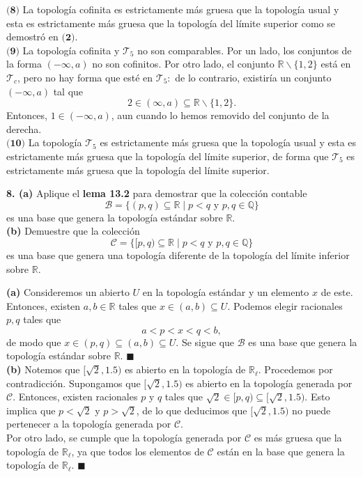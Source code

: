 \documentclass{article}
\begin{document}
$\textbf{(8)}$ La topología cofinita es estrictamente más gruesa que la topología usual y esta es estrictamente más gruesa que la topología del límite superior como se demostró en $\textbf{(2)}$.\\ 

$\textbf{(9)}$ La topología cofinita y $\mathcal{T}_{5}$ no son comparables. Por un lado, los conjuntos de la forma $(- \infty, a)$ no son cofinitos. Por otro lado, el conjunto $\mathbb{R} \backslash \{ 1, 2\}$ está en $\mathcal{T}_{c}$, pero no hay forma que esté en $\mathcal{T}_{5}: $ de lo contrario, existiría un conjunto $(-\infty, a)$ tal que
$$  2 \in (\infty, a) \subseteq \mathbb{R} \backslash \{1, 2 \}.$$ 
Entonces, $1 \in (- \infty, a)$, aun cuando lo hemos removido del conjunto de la derecha. \\

$\textbf{(10)}$ La topología $\mathcal{T}_{5}$ es estrictamente más gruesa que la topología usual y esta es estrictamente más gruesa que la topología del límite superior, de forma que $\mathcal{T}_{5}$ es estrictamente más gruesa que la topología del límite superior. \\
 

\begin{mybox}
\textbf{8. (a)} Aplique el \textbf{lema 13.2} para demostrar que la colección contable 
$$ \mathcal{B} = \{ (p, q) \subseteq \mathbb{R} \mid p < q \text{ y } p, q \in \mathbb{Q} \} $$
es una base que genera la topología estándar sobre $\mathbb{R}$.	\\

\textbf{(b) }Demuestre que la colección 
$$ \mathcal{C} = \{ [p, q) \subseteq \mathbb{R} \mid p < q \text{ y }p, q \in \mathbb{Q} \} $$
es una base que genera una topología diferente de la topología del límite inferior sobre $\mathbb{R}$.
\end{mybox}	

\textbf{(a)} Consideremos un abierto $U$ en la topología estándar y un elemento $x$ de este. Entonces, existen $a, b \in \mathbb{R}$ tales que $x \in (a, b) \subseteq U$. Podemos elegir racionales $p, q$ tales que 
$$ a < p < x < q < b ,$$
de modo que $x \in (p, q) \subseteq (a, b ) \subseteq U.$ Se sigue que $\mathcal{B}$ es una base que genera la topología estándar sobre $\mathbb{R}$. \hspace{0.5cm} $\blacksquare$ \\

\textbf{(b) } Notemos que $[\sqrt{2}, 1.5)$ es abierto en la topología de $\mathbb{R}_{\ell}$. Procedemos por contradicción. Supongamos que $[\sqrt{2}, 1.5)$ es abierto en la topología generada por $\mathcal{C}$. Entonces, existen racionales $p$ y $q$ tales que $\sqrt{2} \in [p, q) \subseteq [\sqrt{2}, 1.5)$. Esto implica que $p < \sqrt{2}$ y $p > \sqrt{2}$, de lo que deducimos que $[\sqrt{2}, 1.5)$ no puede pertenecer a la topología generada por $\mathcal{C}$. \\
Por otro lado, se cumple que la topología generada por $\mathcal{C}$ es más gruesa que la topología de $\mathbb{R}_{\ell}$, ya que todos los elementos de $\mathcal{C}$ están en la base que genera la topología de $\mathbb{R}_{\ell}$. \hspace{0.5cm} $\blacksquare$
\end{document}
